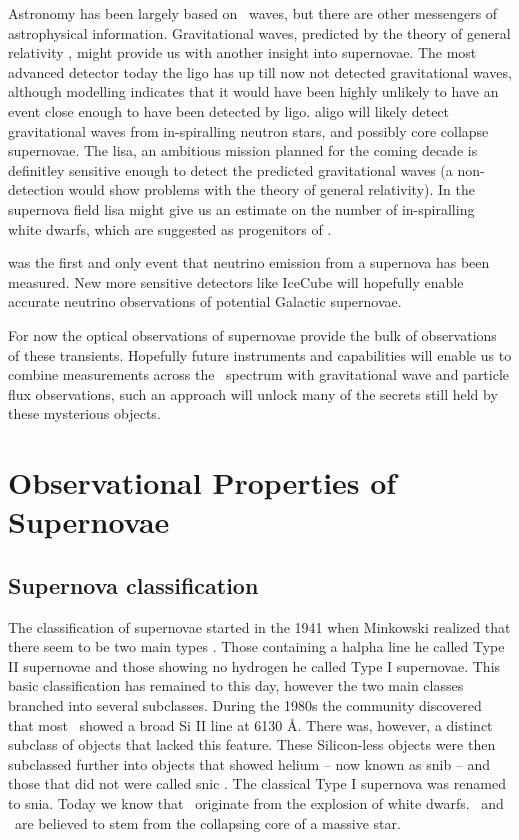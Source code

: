 Astronomy has been largely based on \EM\ waves, but there are other messengers of astrophysical information. Gravitational waves, predicted by the theory of general relativity  \citep{1918SPAW.......154E}, might provide us with another insight into supernovae. The most advanced detector today the \gls{ligo} has up till now not detected gravitational waves, although modelling indicates that it would have been highly unlikely to have an event close enough to have been detected by \gls{ligo}. \gls{aligo} will likely detect gravitational waves from in-spiralling neutron stars, and possibly core collapse supernovae. The \gls{lisa}, an ambitious mission planned for the coming decade is definitley sensitive enough to detect the predicted gravitational waves (a non-detection would show problems with the theory of general relativity). In the supernova field \gls{lisa} might give us an estimate on the number of in-spiralling white dwarfs, which are suggested as progenitors of \sneia.

 was the first and only event that neutrino emission from a supernova has been measured\citep{1987PhRvL..58.1494B,1987PhRvL..58.1490H,Alekseev:1988gp}. New more sensitive detectors like IceCube \citep{2008ICRC....4..835K} will hopefully enable accurate neutrino observations of potential Galactic supernovae.

For now the optical observations of supernovae provide the bulk of observations of these transients. Hopefully future instruments and capabilities will enable us to combine measurements across the \EM\ spectrum with gravitational wave and particle flux observations, such an approach will unlock many of the secrets still held by these mysterious objects.

\section{Observational Properties of Supernovae}

\subsection{Supernova classification}
\label{sec:sn_classification}

The classification of supernovae started in the 1941 when Minkowski realized that there seem to be two main types \citep{1941PASP...53..224M}. Those containing a \gls{halpha} line he called Type II supernovae and those showing no hydrogen he called Type I supernovae. This basic classification has remained to this day, however the two main classes branched into several subclasses. During the 1980s the community discovered that most \sneia\ showed a broad Si II line at 6130 \AA. There was, however, a distinct subclass of objects that lacked this feature. These Silicon-less objects were then subclassed further into objects that showed helium -- now known as \gls{snib} --  and those that did not were called \gls{snic} \citep[see spectra in Figure \ref{fig:sn_classification};]{1987ApJ...317..355H, 1986ApJ...306L..77G}. The classical Type I supernova was renamed to \gls{snia}. Today we know that \sneia\ originate from the explosion of white dwarfs. \sneii\ and \sneibc\ are believed to stem from the collapsing core of a massive star. 

